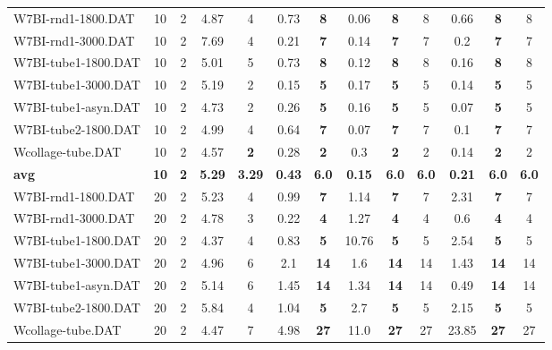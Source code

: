 \begin{table}[h]
{\begin{tabular}{lcccccccccccc}
W7BI-rnd1-1800.DAT & 10 & 2 & 4.87 & 4 & 0.73 &  \textbf{8} &  \textcolor{blue2}{0.06} &  \textbf{8} & 8 & 0.66 &  \textbf{8} & 8 \\
W7BI-rnd1-3000.DAT & 10 & 2 & 7.69 & 4 & 0.21 &  \textbf{7} &  \textcolor{blue2}{0.14} &  \textbf{7} & 7 & 0.2 &  \textbf{7} & 7 \\
W7BI-tube1-1800.DAT & 10 & 2 & 5.01 & 5 & 0.73 &  \textbf{8} &  \textcolor{blue2}{0.12} &  \textbf{8} & 8 & 0.16 &  \textbf{8} & 8 \\
W7BI-tube1-3000.DAT & 10 & 2 & 5.19 & 2 & 0.15 &  \textbf{5} & 0.17 &  \textbf{5} & 5 &  \textcolor{blue2}{0.14} &  \textbf{5} & 5 \\
W7BI-tube1-asyn.DAT & 10 & 2 & 4.73 & 2 & 0.26 &  \textbf{5} & 0.16 &  \textbf{5} & 5 &  \textcolor{blue2}{0.07} &  \textbf{5} & 5 \\
W7BI-tube2-1800.DAT & 10 & 2 & 4.99 & 4 & 0.64 &  \textbf{7} &  \textcolor{blue2}{0.07} &  \textbf{7} & 7 & 0.1 &  \textbf{7} & 7 \\
Wcollage-tube.DAT & 10 & 2 & 4.57 &  \textbf{2} & 0.28 &  \textbf{2} & 0.3 &  \textbf{2} & 2 &  \textcolor{blue2}{0.14} &  \textbf{2} & 2 \\
\cline{1-13} \textbf{avg} & \textbf{10} & \textbf{2} & \textbf{5.29} & \textbf{3.29} & \textbf{0.43} & \textbf{6.0} & \textbf{0.15} & \textbf{6.0} & \textbf{6.0} & \textbf{0.21} & \textbf{6.0} & \textbf{6.0} \\ \cline{1-13}
W7BI-rnd1-1800.DAT & 20 & 2 & 5.23 & 4 &  \textcolor{blue2}{0.99} &  \textbf{7} & 1.14 &  \textbf{7} & 7 & 2.31 &  \textbf{7} & 7 \\
W7BI-rnd1-3000.DAT & 20 & 2 & 4.78 & 3 &  \textcolor{blue2}{0.22} &  \textbf{4} & 1.27 &  \textbf{4} & 4 & 0.6 &  \textbf{4} & 4 \\
W7BI-tube1-1800.DAT & 20 & 2 & 4.37 & 4 &  \textcolor{blue2}{0.83} &  \textbf{5} & 10.76 &  \textbf{5} & 5 & 2.54 &  \textbf{5} & 5 \\
W7BI-tube1-3000.DAT & 20 & 2 & 4.96 & 6 & 2.1 &  \textbf{14} & 1.6 &  \textbf{14} & 14 &  \textcolor{blue2}{1.43} &  \textbf{14} & 14 \\
W7BI-tube1-asyn.DAT & 20 & 2 & 5.14 & 6 & 1.45 &  \textbf{14} & 1.34 &  \textbf{14} & 14 &  \textcolor{blue2}{0.49} &  \textbf{14} & 14 \\
W7BI-tube2-1800.DAT & 20 & 2 & 5.84 & 4 &  \textcolor{blue2}{1.04} &  \textbf{5} & 2.7 &  \textbf{5} & 5 & 2.15 &  \textbf{5} & 5 \\
Wcollage-tube.DAT & 20 & 2 &  \textcolor{blue2}{4.47} & 7 & 4.98 &  \textbf{27} & 11.0 &  \textbf{27} & 27 & 23.85 &  \textbf{27} & 27 \\

\end{tabular}}
\end{table}
